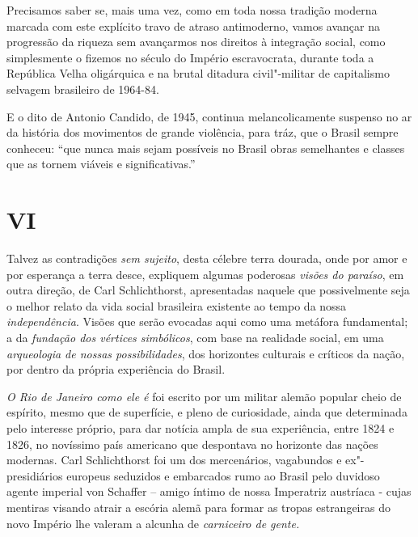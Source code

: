 Precisamos saber se, mais uma vez, como em toda nossa tradição moderna
marcada com este explícito travo de atraso antimoderno, vamos avançar na
progressão da riqueza sem avançarmos nos direitos à integração social,
como simplesmente o fizemos no século do Império escravocrata, durante
toda a República Velha oligárquica e na brutal ditadura civil"-militar de
capitalismo selvagem brasileiro de 1964-84.

E o dito de Antonio Candido, de 1945, continua melancolicamente suspenso
no ar da história dos movimentos de grande violência, para tráz, que o
Brasil sempre conheceu: ``que nunca mais sejam possíveis no Brasil obras
semelhantes e classes que as tornem viáveis e significativas.''

\section{VI}

Talvez as contradições \emph{sem sujeito}, desta célebre terra dourada,
onde por amor e por esperança a terra desce, expliquem algumas poderosas
\emph{visões do paraíso}, em outra direção, de Carl Schlichthorst,
apresentadas naquele que possivelmente seja o melhor relato da vida
social brasileira existente ao tempo da nossa \emph{independência}.
Visões que serão evocadas aqui como uma metáfora fundamental; a da
\emph{fundação dos vértices simbólicos}, com base na realidade social,
em uma \emph{arqueologia de nossas possibilidades}, dos horizontes
culturais e críticos da nação, por dentro da própria experiência do
Brasil.

\emph{O Rio de Janeiro como ele é} foi escrito por um militar alemão
popular cheio de espírito, mesmo que de superfície, e pleno de
curiosidade, ainda que determinada pelo interesse próprio, para dar
notícia ampla de sua experiência, entre 1824 e 1826, no novíssimo país
americano que despontava no horizonte das nações modernas. Carl
Schlichthorst foi um dos mercenários, vagabundos e ex"-presidiários
europeus seduzidos e embarcados rumo ao Brasil pelo duvidoso agente
imperial von Schaffer -- amigo íntimo de nossa Imperatriz austríaca -
cujas mentiras visando atrair a escória alemã para formar as tropas
estrangeiras do novo Império lhe valeram a alcunha de \emph{carniceiro
de gente.}


